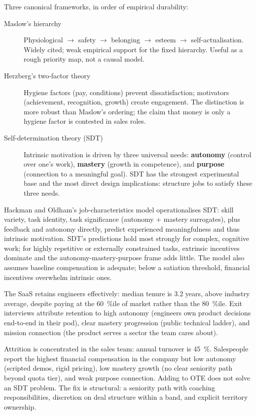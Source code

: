Three canonical frameworks, in order of empirical durability:
\begin{description}
  \item[Maslow's hierarchy] Physiological $\to$ safety $\to$ belonging $\to$ esteem $\to$ self-actualisation. Widely cited; weak empirical support for the fixed hierarchy. Useful as a rough priority map, not a causal model.
  \item[Herzberg's two-factor theory] Hygiene factors (pay, conditions) prevent dissatisfaction; motivators (achievement, recognition, growth) create engagement. The distinction is more robust than Maslow's ordering; the claim that money is only a hygiene factor is contested in sales roles.
  \item[Self-determination theory (SDT)] Intrinsic motivation is driven by three universal needs: \textbf{autonomy} (control over one's work), \textbf{mastery} (growth in competence), and \textbf{purpose} (connection to a meaningful goal). SDT has the strongest experimental base and the most direct design implications: structure jobs to satisfy these three needs.
\end{description}
Hackman and Oldham's job-characteristics model operationalises SDT: skill variety, task identity, task significance (autonomy + mastery surrogates), plus feedback and autonomy directly, predict experienced meaningfulness and thus intrinsic motivation. SDT's predictions hold most strongly for complex, cognitive work; for highly repetitive or externally constrained tasks, extrinsic incentives dominate and the autonomy-mastery-purpose frame adds little. The model also assumes baseline compensation is adequate; below a satiation threshold, financial incentives overwhelm intrinsic ones.

\begin{example}
The SaaS retains engineers effectively: median tenure is 3.2 years, above industry average, despite paying at the \qty{60}{\percent}ile of market rather than the \qty{80}{\percent}ile. Exit interviews attribute retention to high autonomy (engineers own product decisions end-to-end in their pod), clear mastery progression (public technical ladder), and mission connection (the product serves a sector the team cares about).

Attrition is concentrated in the sales team: annual turnover is \qty{45}{\percent}. Salespeople report the highest financial compensation in the company but low autonomy (scripted demos, rigid pricing), low mastery growth (no clear seniority path beyond quota tier), and weak purpose connection. Adding  to OTE does not solve an SDT problem. The fix is structural: a seniority path with coaching responsibilities, discretion on deal structure within a band, and explicit territory ownership.
\end{example}

